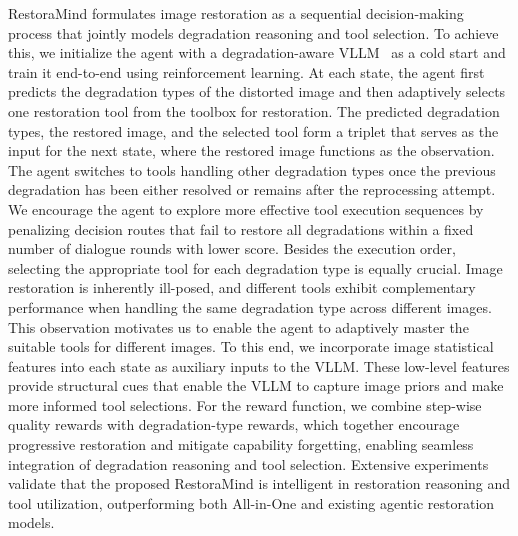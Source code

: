 RestoraMind formulates image restoration as a sequential decision-making process that jointly models degradation reasoning and tool selection. To achieve this, we initialize the agent with a degradation-aware VLLM~\cite{li2025q} as a cold start and train it end-to-end using reinforcement learning. At each state, the agent first predicts the degradation types of the distorted image and then adaptively selects one restoration tool from the toolbox for restoration. The predicted degradation types, the restored image, and the selected tool form a triplet that serves as the input for the next state, where the restored image functions as the observation. 
The agent switches to tools handling other degradation types once the previous degradation has been either resolved or remains after the reprocessing attempt. We encourage the agent to explore more effective tool execution sequences by penalizing decision routes that fail to restore all degradations within a fixed number of dialogue rounds with lower score. Besides the execution order, selecting the appropriate tool for each degradation type is equally crucial. Image restoration is inherently ill-posed, and different tools exhibit complementary performance when handling the same degradation type across different images. This observation motivates us to enable the agent to adaptively master the suitable tools for different images. To this end, we incorporate image statistical features into each state as auxiliary inputs to the VLLM. These low-level features provide structural cues that enable the VLLM to capture image priors and make more informed tool selections. For the reward function, we combine step-wise quality rewards with degradation-type rewards, which together encourage progressive restoration and mitigate capability forgetting, enabling seamless integration of degradation reasoning and tool selection. Extensive experiments validate that the proposed RestoraMind is intelligent in restoration reasoning and tool utilization, outperforming both All-in-One and existing agentic restoration models.


